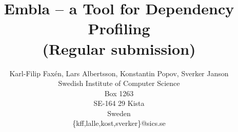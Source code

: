 \documentclass[11pt]{article}
\begin{document}
\begin{titlepage}

\title{Embla -- a Tool for Dependency Profiling \\
  \Large (Regular submission)}
\author{Karl-Filip Fax\'en, Lars Albertsson, Konstantin Popov, Sverker Janson\\
       Swedish Institute of Computer Science\\
       Box 1263\\
       SE-164 29 Kista\\
       Sweden\\
       \{kff,lalle,kost,sverker\}@sics.se}
\date{}
\maketitle
\thispagestyle{empty}


\end{titlepage}




%






\end{document}
